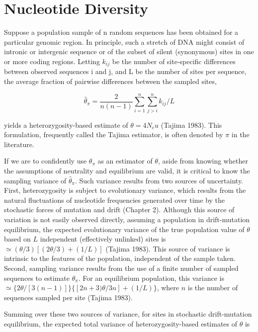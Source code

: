 \documentclass{article}
\begin{document}
\section{Nucleotide Diversity}
Suppose a population sample of n random sequences has been obtained for a particular genomic region. In principle, such a stretch of DNA might consist of intronic or intergenic sequence or of the subset of silent (synonymous) sites in one or more coding regions. Letting  $ k_{ij} $ be the number of site-specific differences between observed sequences i and j, and L be the number of sites per sequence, the average fraction of pairwise differences between the sampled sites,

\begin{equation}
\widehat{\theta}_{\pi}=\frac{2}{n(n-1)}\sum_{i=1}^{n}\sum_{j>i}^{n}k_{ij}/L
\tag{4.1}
\label{eq:4_1}
\end{equation}

yields a heterozygosity-based estimate of  $ \theta = 4N_{e}u $ (Tajima 1983). This formulation, frequently called the Tajima estimator, is often denoted by  $ \pi $ in the literature.

If we are to confidently use  $ \theta_\pi $ as an estimator of  $ \theta $, aside from knowing whether the assumptions of neutrality and equilibrium are valid, it is critical to know the sampling variance of  $ \widehat{\theta}_\pi $. Such variance results from two sources of uncertainty. First, heterozygosity is subject to evolutionary variance, which results from the natural fluctuations of nucleotide frequencies generated over time by the stochastic forces of mutation and drift (Chapter 2). Although this source of variation is not easily observed directly, assuming a population in drift-mutation equilibrium, the expected evolutionary variance of the true population value of  $ \theta $ based on  $ L $ independent (effectively unlinked) sites is  $ \simeq (\theta/3)[(2\theta/3) + (1/L)] $ (Tajima 1983). This source of variance is intrinsic to the features of the population, independent of the sample taken. Second, sampling variance results from the use of a finite number of sampled sequences to estimate  $ \theta_\pi $. For an equilibrium population, this variance is  $ \simeq \{2\theta/[3(n-1)]\}\{[2n+3)\theta/3n] + (1/L)\} $, where  $ n $ is the number of sequences sampled per site (Tajima 1983).

Summing over these two sources of variance, for sites in stochastic drift-mutation equilibrium, the expected total variance of heterozygosity-based estimates of  $ \theta $ is
\end{document}
